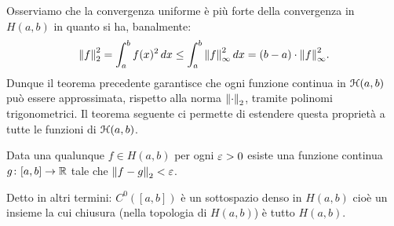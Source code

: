 Osserviamo che la convergenza uniforme è più forte della convergenza
in $H(a,b)$ in quanto si ha, banalmente:
\[
  {\left\Vert f\right\Vert}_2^2 = \int_a^b f(x)^2\, dx
  \le \int_a^b {\left\Vert f\right\Vert}_\infty^2\, dx
  = (b-a) \cdot {\left\Vert f\right\Vert}_\infty^2.
\]
Dunque il teorema precedente garantisce che ogni funzione continua
in $\mathcal H(a,b)$ può essere approssimata, rispetto alla norma ${\left\Vert \cdot\right\Vert}_2$,
tramite polinomi trigonometrici. Il teorema seguente ci permette
di estendere questa proprietà a tutte le funzioni di $\mathcal H(a,b)$.

\begin{theorem}
Data una qualunque $f\in H(a, b)$ per ogni $\varepsilon>0$
esiste una funzione continua $g\colon [a,b]\to {\mathbb R}$
tale che ${\left\Vert f-g\right\Vert}_2<\varepsilon$.

Detto in altri termini: $C^0([a,b])$ è un sottospazio denso in $H(a,b)$
cioè un insieme la cui chiusura (nella topologia di $H(a,b)$) è tutto $H(a,b)$.
\end{theorem}
%
